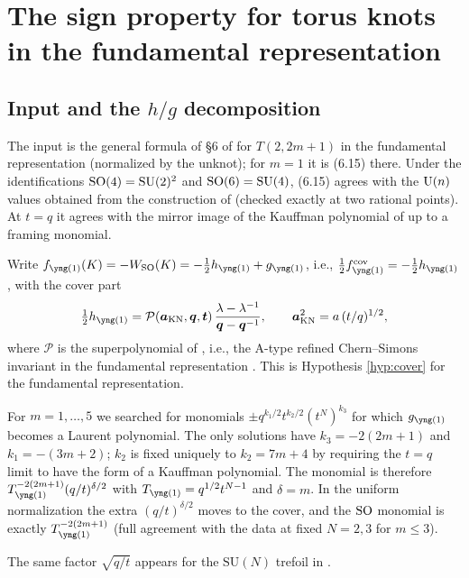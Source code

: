 \section{The sign property for torus knots in the fundamental representation}\label{sec:torus}

\subsection{Input and the $h/g$ decomposition}
The input is the general formula of \S6 of \cite{AgSc12} for $T(2,2m+1)$ in the fundamental representation (normalized by the unknot); for $m = 1$ it is (6.15) there.
Under the identifications $\mathrm{SO}(4) = \mathrm{SU}(2)^2$ and $\mathrm{SO}(6) = \mathrm{SU}(4)$, (6.15) agrees with the $\mathrm{U}(n)$ values obtained from the construction of \cite{GN13} (checked exactly at two rational points).
At $t = q$ it agrees with the mirror image of the Kauffman polynomial of \cite{Marino09} up to a framing monomial.

\begin{hypothesis}[$h/g$ decomposition]\label{hyp:hg}
Write $f_{\yone}(K) = -W_{\SO}(K) = -\tfrac12 h_{\yone} + g_{\yone}$, i.e., $\tfrac12 f^{\cov}_{\yone} = -\tfrac12 h_{\yone}$, with the cover part
\begin{equation}\label{eq:hg}
\tfrac12 h_{\yone} = \mathcal{P}(\ba_{\mathrm{KN}}, \bq, \bt)\,\frac{\lambda - \lambda^{-1}}{\bq - \bq^{-1}},\qquad \ba_{\mathrm{KN}}^2 = a\,(t/q)^{1/2},
\end{equation}
where $\mathcal P$ is the superpolynomial of \cite{DGR05}, i.e., the A-type refined Chern--Simons invariant in the fundamental representation \cite{AgSh11}. This is Hypothesis \ref{hyp:cover} for the fundamental representation.
\end{hypothesis}

\begin{result}\label{cr:monomial}
For $m = 1, \dots, 5$ we searched for monomials $\pm q^{k_1/2} t^{k_2/2} (t^N)^{k_3}$ for which $g_{\yone}$ becomes a Laurent polynomial. The only solutions have $k_3 = -2(2m+1)$ and $k_1 = -(3m+2)$; $k_2$ is fixed uniquely to $k_2 = 7m+4$ by requiring the $t = q$ limit to have the form of a Kauffman polynomial. The monomial is therefore $T_{\yone}^{-2(2m+1)}(q/t)^{\delta/2}$ with $T_{\yone} = q^{1/2}t^{N-1}$ and $\delta = m$.
In the uniform normalization the extra $(q/t)^{\delta/2}$ moves to the cover, and the $\mathrm{SO}$ monomial is exactly $T_{\yone}^{-2(2m+1)}$ (full agreement with the data at fixed $N = 2, 3$ for $m \le 3$).
\end{result}
The same factor $\sqrt{q/t}$ appears for the $\mathrm{SU}(N)$ trefoil in \cite{AgSh11}.

